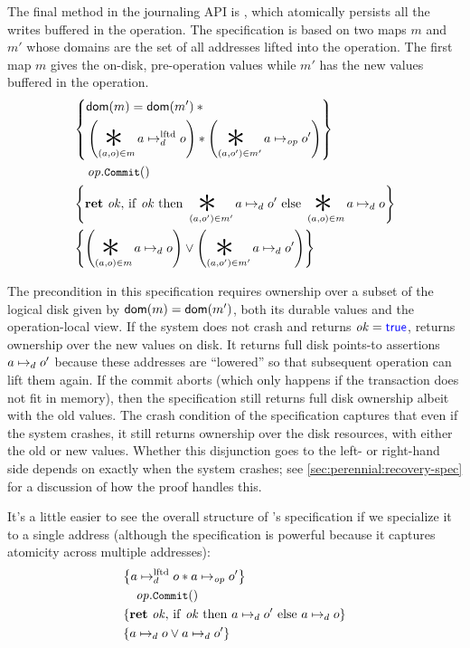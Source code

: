 The final method in the journaling API is , which atomically
persists all the writes buffered in the operation. The specification is based on
two maps $m$ and $m'$ whose domains are the set of all addresses lifted into the
operation. The first map $m$ gives the on-disk, pre-operation values while $m'$
has the new values buffered in the operation.
\begin{align*}
  \hoareCV{ \begin{aligned}
              &\dom(m) = \dom(m') \sep {} \\
  &\left( \bigast_{(a,o) \in m} a \mapstoLftd o \right) \sep %
  \left( \bigast_{(a,o') \in m'} a \mapstoOp o' \right)
            \end{aligned}} %
  {\mathit{op}.\cc{Commit}()}%
  {\Ret{\mathit{ok}} \mathrm{if~} \mathit{ok} %
  \mathrm{~then~} \bigast_{(a,o') \in m'} a \mapstoDisk o' \mathrm{~else~} %
    \bigast_{(a,o) \in m} a \mapstoDisk o}%
  {\left( \bigast_{(a,o) \in m} a \mapstoDisk o \right) \lor
    \left( \bigast_{(a,o') \in m'} a \mapstoDisk o' \right) }
\end{align*}

The precondition in this specification requires ownership over a subset of the
logical disk given by $\textsf{\upshape dom}(m) = \textsf{\upshape dom}(m')$, both its durable values and the
operation-local view. If the system does not crash and returns
$\mathit{ok} = \mathsf{\textcolor{blue}{true}}$,  returns ownership over the new values
on disk. It returns full disk points-to assertions $a \mapsto_d o'$ because
these addresses are ``lowered'' so that subsequent operation can lift them
again. If the commit aborts (which only happens if the transaction does not fit
in memory), then the specification still returns full disk ownership albeit with
the old values. The crash condition of the  specification captures
that even if the system crashes, it still returns ownership over the disk
resources, with either the old or new values. Whether this disjunction goes to
the left- or right-hand side depends on exactly when the system crashes; see
\cref{sec:perennial:recovery-spec} for a discussion of how the proof handles
this.

It's a little easier to see the overall structure of 's specification
if we specialize it to a single address (although the specification is powerful
because it captures atomicity across multiple addresses):
\begin{align*}
  \hoareCV{a \mapstoLftd o \sep a \mapstoOp o'} %
  {\mathit{op}.\cc{Commit}()}%
  {\Ret{\mathit{ok}} \mathrm{if~} \mathit{ok} %
  \mathrm{~then~} a \mapstoDisk o' \mathrm{~else~} a \mapstoDisk o}%
  {a \mapstoDisk o \lor a \mapstoDisk o'}
\end{align*}
